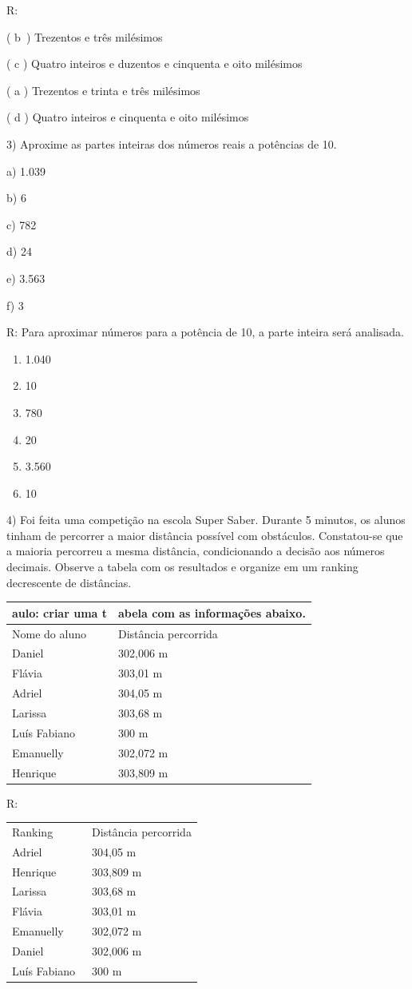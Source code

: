 R:

( b~) Trezentos e três milésimos~

( c ) Quatro inteiros e duzentos e cinquenta e oito milésimos

( a ) Trezentos e trinta e três milésimos

( d ) Quatro inteiros e cinquenta e oito milésimos

3) Aproxime as partes inteiras dos números reais a potências de 10.

a) 1.039

b) 6

c) 782

d) 24

e) 3.563

f) 3

R: Para aproximar números para a potência de 10, a parte inteira será
analisada.

\begin{enumerate}
\def\labelenumi{\alph{enumi})}
\item
  1.040
\item
  10
\item
  780
\item
  20
\item
  3.560
\item
  10
\end{enumerate}

4) Foi feita uma competição na escola Super Saber. Durante 5 minutos, os
alunos tinham de percorrer a maior distância possível com obstáculos.
Constatou-se que a maioria percorreu a mesma distância, condicionando a
decisão aos números decimais. Observe a tabela com os resultados e
organize em um ranking decrescente de distâncias.~

\begin{longtable}[]{@{}ll@{}}
\toprule
aulo: criar uma t & abela com as informações abaixo.\tabularnewline
\midrule
\endhead
Nome do aluno~ & Distância percorrida\tabularnewline
Daniel~ & 302,006 m\tabularnewline
Flávia~ & 303,01 m\tabularnewline
Adriel~ & 304,05 m\tabularnewline
Larissa~ & 303,68 m\tabularnewline
Luís Fabiano~ & 300 m~\tabularnewline
Emanuelly~ & 302,072 m\tabularnewline
Henrique~ & 303,809 m\tabularnewline
\bottomrule
\end{longtable}

R:

\begin{longtable}[]{@{}ll@{}}
\toprule
\endhead
Ranking~ & Distância percorrida\tabularnewline
Adriel~ & 304,05 m\tabularnewline
Henrique~ & 303,809 m\tabularnewline
Larissa~ & 303,68 m\tabularnewline
Flávia~ & 303,01 m\tabularnewline
Emanuelly~ & 302,072 m\tabularnewline
Daniel~ & 302,006 m\tabularnewline
Luís Fabiano~ & 300 m~\tabularnewline
\bottomrule
\end{longtable}

